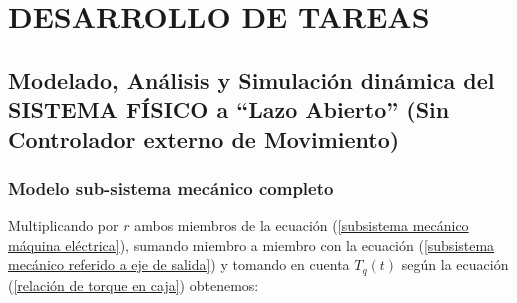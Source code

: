 \documentclass[a4paper, 10pt, journal]{ieeeconf}
\begin{document}
\section{DESARROLLO DE TAREAS}


\subsection{\textbf{Modelado, Análisis y Simulación dinámica del SISTEMA FÍSICO a “Lazo
Abierto” (Sin Controlador externo de Movimiento)}}



\subsubsection{\textbf{Modelo sub-sistema mecánico completo}}
Multiplicando por $r$ ambos miembros de la ecuación (\ref{subsistema mecánico máquina eléctrica}), sumando miembro a miembro con la ecuación (\ref{subsistema mecánico referido a eje de salida}) y tomando en cuenta $T_q(t)$ según la ecuación (\ref{relación de torque en caja}) obtenemos:
\end{document}
